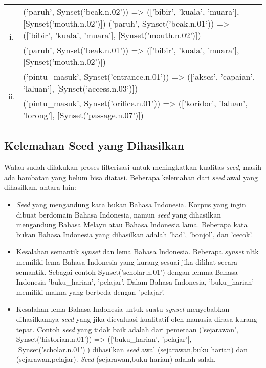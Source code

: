 \begin{center}
\begin{tabular}{ |c|m{30em}| } 
\hline
\multirow{2}{*}{i.} & ('paruh', Synset('beak.n.02')) => (['bibir', 'kuala', 'muara'], [Synset('mouth.n.02')])
('paruh', Synset('beak.n.01')) => (['bibir', 'kuala', 'muara'], [Synset('mouth.n.02')]) \\ 
& ('paruh', Synset('beak.n.01')) => (['bibir', 'kuala', 'muara'], [Synset('mouth.n.02')]) \\ 
\hline
\multirow{2}{*}{ii.} & ('pintu\_masuk', Synset('entrance.n.01')) => (['akses', 'capaian', 'laluan'], [Synset('access.n.03')]) \\ 
& ('pintu\_masuk', Synset('orifice.n.01')) => (['koridor', 'laluan', 'lorong'], [Synset('passage.n.07')]) \\ 
\hline
\end{tabular}
\end{center}

\subsection{Kelemahan Seed yang Dihasilkan}
Walau sudah dilakukan proses filterisasi untuk meningkatkan kualitas \textit{seed}, masih ada hambatan yang belum bisa diatasi. Beberapa kelemahan dari \textit{seed} awal yang dihasilkan, antara lain:
\begin{itemize}
  \item \textit{Seed} yang mengandung kata bukan Bahasa Indonesia. Korpus yang ingin dibuat berdomain Bahasa Indonesia, namun \textit{seed} yang dihasilkan mengandung Bahasa Melayu atau Bahasa Indonesia lama. Beberapa kata bukan Bahasa Indonesia yang dihasilkan adalah 'had', 'bonjol', dan 'cecok'.
  \item Kesalahan semantik \textit{synset} dan lema Bahasa Indonesia. Beberapa \textit{synset} nltk memiliki lema Bahasa Indonesia yang kurang sesuai jika dilihat secara semantik. Sebagai contoh Synset('scholar.n.01') dengan lemma Bahasa Indonesia {'buku_harian', 'pelajar'}. Dalam Bahasa Indonesia, 'buku_harian' memiliki makna yang berbeda dengan 'pelajar'.
  \item Kesalahan lema Bahasa Indonesia untuk suatu \textit{synset} menyebabkan dihasilkannya \textit{seed} yang jika dievaluasi kualitatif oleh manusia dirasa kurang tepat. Contoh \textit{seed} yang tidak baik adalah dari pemetaan ('sejarawan', Synset('historian.n.01')) => (['buku_harian', 'pelajar'], [Synset('scholar.n.01')]) dihasilkan \textit{seed} awal (sejarawan,buku harian) dan (sejarawan,pelajar). \textit{Seed} (sejarawan,buku harian) adalah salah.
\end{itemize}
